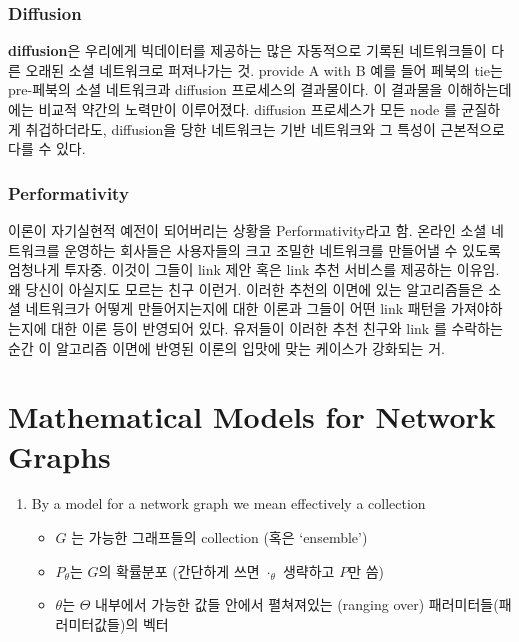 \documentclass[
]{book}
\providecommand{\tightlist}{%
  \setlength{\itemsep}{0pt}\setlength{\parskip}{0pt}}
\begin{document}
{{{\hypertarget{diffusion}{%
\subsubsection{Diffusion}\label{diffusion}}

\textbf{diffusion}은 우리에게 빅데이터를 제공하는 많은 자동적으로 기록된 네트워크들이 다른 오래된 소셜 네트워크로 퍼져나가는 것. provide A with B 예를 들어 페북의 tie는 pre-페북의 소셜 네트워크과 diffusion 프로세스의 결과물이다. 이 결과물을 이해하는데에는 비교적 약간의 노력만이 이루어졌다. diffusion 프로세스가 모든 node 를 균질하게 취겁하더라도, diffusion을 당한 네트워크는 기반 네트워크와 그 특성이 근본적으로 다를 수 있다.

\hypertarget{performativity}{%
\subsubsection{Performativity}\label{performativity}}

이론이 자기실현적 예전이 되어버리는 상황을 Performativity라고 함. 온라인 소셜 네트워크를 운영하는 회사들은 사용자들의 크고 조밀한 네트워크를 만들어낼 수 있도록 엄청나게 투자중. 이것이 그들이 link 제안 혹은 link 추천 서비스를 제공하는 이유임. 왜 당신이 아실지도 모르는 친구 이런거. 이러한 추천의 이면에 있는 알고리즘들은 소셜 네트워크가 어떻게 만들어지는지에 대한 이론과 그들이 어떤 link 패턴을 가져야하는지에 대한 이론 등이 반영되어 있다. 유저들이 이러한 추천 친구와 link 를 수락하는 순간 이 알고리즘 이면에 반영된 이론의 입맛에 맞는 케이스가 강화되는 거.

\hypertarget{mathematical-models-for-network-graphs}{%
\section{Mathematical Models for Network Graphs}\label{mathematical-models-for-network-graphs}}

\begin{enumerate}
\def\labelenumi{\arabic{enumi}.}
\tightlist
\item
  By a model for a network graph we mean effectively a collection

  \begin{itemize}
  \tightlist
  \item
    \(G\) 는 가능한 그래프들의 collection (혹은 `ensemble')
  \item
    \(P_\theta\)는 \(G\)의 확률분포 (간단하게 쓰면 \(\cdot_\theta\) 생략하고 \(P\)만 씀)
  \item
    \(\theta\)는 \(\Theta\) 내부에서 가능한 값들 안에서 펼쳐져있는 (ranging over) 패러미터들(패러미터값들)의 벡터
  \end{itemize}
\end{enumerate}

}}}
\end{document}
